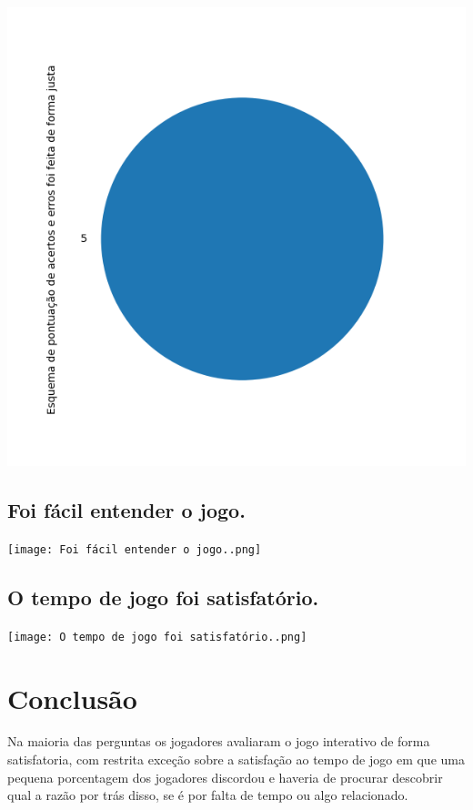 \documentclass[12pt]{article}
\begin{document}
\begin{center}
  \includegraphics[scale=0.4]{Esquema de pontuação de acertos e erros foi feita de forma justa.png}
\end{center}

\subsection{Foi fácil entender o jogo.}

\begin{center}
  \texttt{[image: Foi fácil entender o jogo..png]}
\end{center}

\subsection{O tempo de jogo foi satisfatório.}

\begin{center}
  \texttt{[image: O tempo de jogo foi satisfatório..png]}
\end{center}


\section{Conclusão}

Na maioria das perguntas os jogadores avaliaram o jogo interativo de forma satisfatoria, com restrita exceção sobre a satisfação ao tempo de jogo em que uma pequena porcentagem dos jogadores discordou e haveria de procurar descobrir qual a razão por trás disso, se é por falta de tempo ou algo relacionado.



\end{document}

